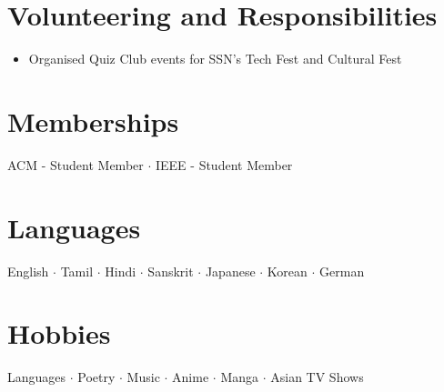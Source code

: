 \documentclass[letterpaper,11pt]{article}
\newcommand{\resumeItem}[2]{
\item\small{
\textbf{#1}{ #2 \vspace{-2pt}}
}
}
\newcommand{\resumeSubHeadingListStart}{\begin{itemize}[leftmargin=*]}
\newcommand{\resumeSubHeadingListEnd}{\end{itemize}}
\begin{document}
\section{Volunteering and Responsibilities}
\resumeSubHeadingListStart
\resumeItem{}{Organised Quiz Club events for SSN's Tech Fest and Cultural Fest}
\resumeSubHeadingListEnd

\section{Memberships}
ACM - Student Member $\cdot$ IEEE - Student Member

\section{Languages}
English $\cdot$ Tamil $\cdot$ Hindi $\cdot$ Sanskrit $\cdot$ Japanese $\cdot$ Korean $\cdot$ German

\section{Hobbies}
Languages $\cdot$ Poetry $\cdot$ Music $\cdot$ Anime $\cdot$ Manga $\cdot$ Asian TV Shows

\end{document}
